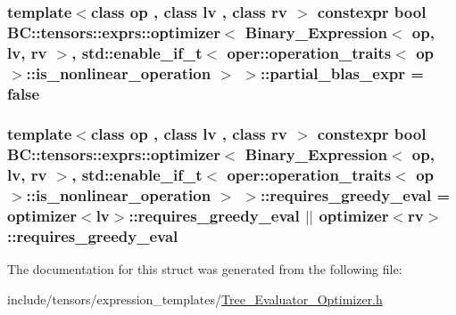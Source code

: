 \subsubsection[{\texorpdfstring{partial\+\_\+blas\+\_\+expr}{partial_blas_expr}}]{\setlength{\rightskip}{0pt plus 5cm}template$<$class op , class lv , class rv $>$ constexpr bool {\bf B\+C\+::tensors\+::exprs\+::optimizer}$<$ {\bf Binary\+\_\+\+Expression}$<$ op, lv, rv $>$, std\+::enable\+\_\+if\+\_\+t$<$ {\bf oper\+::operation\+\_\+traits}$<$ op $>$\+::is\+\_\+nonlinear\+\_\+operation $>$ $>$\+::partial\+\_\+blas\+\_\+expr = false\hspace{0.3cm}{\ttfamily [static]}}\hypertarget{structBC_1_1tensors_1_1exprs_1_1optimizer_3_01Binary__Expression_3_01op_00_01lv_00_01rv_01_4_00_11116ffe640829700a69ab4f1bad216e_acf871878393bd062043e4cfa42912ae6}{}\label{structBC_1_1tensors_1_1exprs_1_1optimizer_3_01Binary__Expression_3_01op_00_01lv_00_01rv_01_4_00_11116ffe640829700a69ab4f1bad216e_acf871878393bd062043e4cfa42912ae6}
\subsubsection[{\texorpdfstring{requires\+\_\+greedy\+\_\+eval}{requires_greedy_eval}}]{\setlength{\rightskip}{0pt plus 5cm}template$<$class op , class lv , class rv $>$ constexpr bool {\bf B\+C\+::tensors\+::exprs\+::optimizer}$<$ {\bf Binary\+\_\+\+Expression}$<$ op, lv, rv $>$, std\+::enable\+\_\+if\+\_\+t$<$ {\bf oper\+::operation\+\_\+traits}$<$ op $>$\+::is\+\_\+nonlinear\+\_\+operation $>$ $>$\+::requires\+\_\+greedy\+\_\+eval = {\bf optimizer}$<$lv$>$\+::requires\+\_\+greedy\+\_\+eval $\vert$$\vert$ {\bf optimizer}$<$rv$>$\+::requires\+\_\+greedy\+\_\+eval\hspace{0.3cm}{\ttfamily [static]}}\hypertarget{structBC_1_1tensors_1_1exprs_1_1optimizer_3_01Binary__Expression_3_01op_00_01lv_00_01rv_01_4_00_11116ffe640829700a69ab4f1bad216e_a3c21596759ff6ff4bc495640273981f4}{}\label{structBC_1_1tensors_1_1exprs_1_1optimizer_3_01Binary__Expression_3_01op_00_01lv_00_01rv_01_4_00_11116ffe640829700a69ab4f1bad216e_a3c21596759ff6ff4bc495640273981f4}


The documentation for this struct was generated from the following file\+:\begin{DoxyCompactItemize}
\item 
include/tensors/expression\+\_\+templates/\hyperlink{Tree__Evaluator__Optimizer_8h}{Tree\+\_\+\+Evaluator\+\_\+\+Optimizer.\+h}\end{DoxyCompactItemize}
